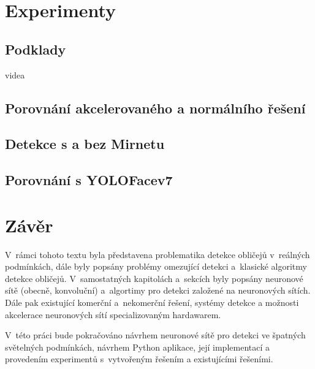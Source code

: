 \chapter{Experimenty}
\label{kapitola:experimenty}

\section{Podklady}
videa

\section{Porovnání akcelerovaného a normálního řešení}


\section{Detekce s a bez Mirnetu}

\section{Porovnání s YOLOFacev7}

\chapter{Závěr}
\label{kapitola:zaver}
V~rámci tohoto textu byla představena problematika detekce obličejů v~reálných podmínkách, dále byly popsány problémy omezující detekci a~klasické algoritmy detekce obličejů. V~samostatných kapitolách a~sekcích byly popsány neuronové sítě (obecně, konvoluční) a~algortimy pro detekci založené na neuronových sítích. Dále pak existující komerční a~nekomerční řešení, systémy detekce a možnosti akcelerace neuronových sítí specializovaným hardawarem.

V~této práci bude pokračováno návrhem neuronové sítě pro detekci ve špatných světelných podmínkách, návrhem Python aplikace, její implementací a provedením experimentů s~vytvořeným řešením a existujícími řešeními.